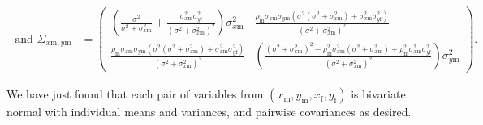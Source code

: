 \documentclass{article}
\newcommand{\x}[1]{\text{#1}}
\begin{document}
\begin{pf}
\begin{enumerate}
\begin{align*}
\\ \text{ and } \Sigma_{x\x{m},y\x{m}}&=\left(\begin{array}{cc}\left(\frac{\sigma^2}{\sigma^2+\sigma_{x\x{m}}^2}+\frac{\sigma_{x\x{m}}^2\sigma_{y\x{f}}^2}{(\sigma^2+\sigma_{x\x{m}}^2)^2}\right)\sigma_{x\x{m}}^2 & \frac{\rho_\x{m}\sigma_{x\x{m}}\sigma_{y\x{m}}(\sigma^2(\sigma^2+\sigma_{x\x{m}}^2)+\sigma_{x\x{m}}^2\sigma_{y\x{f}}^2)}{(\sigma^2+\sigma_{x\x{m}}^2)^2} \\ \frac{\rho_\x{m}\sigma_{x\x{m}}\sigma_{y\x{m}}(\sigma^2(\sigma^2+\sigma_{x\x{m}}^2)+\sigma_{x\x{m}}^2\sigma_{y\x{f}}^2)}{(\sigma^2+\sigma_{x\x{m}}^2)^2} & \left(\frac{(\sigma^2+\sigma_{x\x{m}}^2)^2-\rho_\x{m}^2\sigma_{x\x{m}}^2(\sigma^2+\sigma_{x\x{m}}^2)+\rho_\x{m}^2\sigma_{x\x{m}}^2\sigma_{y\x{f}}^2}{(\sigma^2+\sigma_{x\x{m}}^2)^2}\right)\sigma_{y\x{m}}^2 \end{array}\right).
\end{align*}
\end{enumerate}

We have just found that each pair of variables from $(x_\x{m},y_\x{m},x_\x{f},y_\x{f})$ is bivariate normal with individual means and variances, and pairwise covariances as desired. 

\end{pf}
\end{document}
